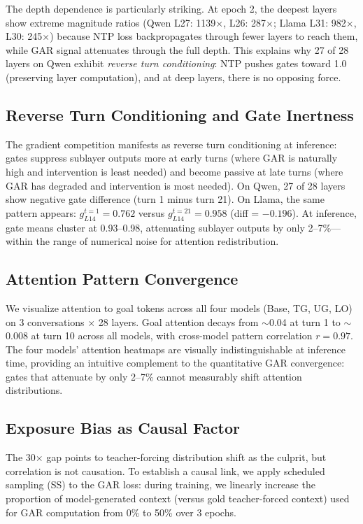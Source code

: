 \documentclass[11pt]{article}
\begin{document}
The depth dependence is particularly striking. At epoch 2, the deepest layers show extreme magnitude ratios (Qwen L27: 1139$\times$, L26: 287$\times$; Llama L31: 982$\times$, L30: 245$\times$) because NTP loss backpropagates through fewer layers to reach them, while GAR signal attenuates through the full depth. This explains why 27 of 28 layers on Qwen exhibit \emph{reverse turn conditioning}: NTP pushes gates toward 1.0 (preserving layer computation), and at deep layers, there is no opposing force.

\subsection{Reverse Turn Conditioning and Gate Inertness}

The gradient competition manifests as reverse turn conditioning at inference: gates suppress sublayer outputs more at early turns (where GAR is naturally high and intervention is least needed) and become passive at late turns (where GAR has degraded and intervention is most needed). On Qwen, 27 of 28 layers show negative gate difference (turn 1 minus turn 21). On Llama, the same pattern appears: $g_{L14}^{t=1} = 0.762$ versus $g_{L14}^{t=21} = 0.958$ (diff = $-0.196$). At inference, gate means cluster at 0.93--0.98, attenuating sublayer outputs by only 2--7\%---within the range of numerical noise for attention redistribution.

\subsection{Attention Pattern Convergence}

We visualize attention to goal tokens across all four models (Base, TG, UG, LO) on 3 conversations $\times$ 28 layers. Goal attention decays from $\sim$0.04 at turn 1 to $\sim$0.008 at turn 10 across all models, with cross-model pattern correlation $r = 0.97$. The four models' attention heatmaps are visually indistinguishable at inference time, providing an intuitive complement to the quantitative GAR convergence: gates that attenuate by only 2--7\% cannot measurably shift attention distributions.

\subsection{Exposure Bias as Causal Factor}
\label{sec:mitigation}

The 30$\times$ gap points to teacher-forcing distribution shift as the culprit, but correlation is not causation. To establish a causal link, we apply scheduled sampling (SS) to the GAR loss: during training, we linearly increase the proportion of model-generated context (versus gold teacher-forced context) used for GAR computation from 0\% to 50\% over 3 epochs.
\end{document}
